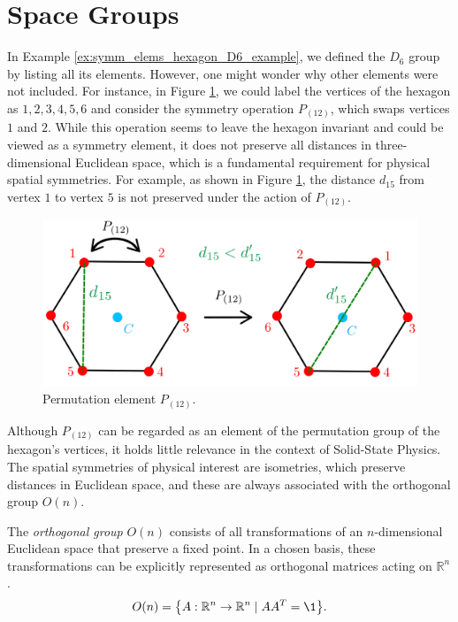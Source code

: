 \section{Space Groups} \label{sec:space_groups}

In Example \ref{ex:symm_elems_hexagon_D6_example}, we defined the \(D_6\) group by listing all its elements. However, one might wonder why other elements were not included. For instance, in Figure \ref{fig:hexagon_perm_12}, we could label the vertices of the hexagon as \(1, 2, 3, 4, 5, 6\) and consider the symmetry operation \(P_{(12)}\), which swaps vertices \(1\) and \(2\). While this operation seems to leave the hexagon invariant and could be viewed as a symmetry element, it does not preserve all distances in three-dimensional Euclidean space, which is a fundamental requirement for physical spatial symmetries. For example, as shown in Figure \ref{fig:hexagon_perm_12}, the distance \(d_{15}\) from vertex \(1\) to vertex \(5\) is not preserved under the action of \(P_{(12)}\).

\begin{figure}[H]
\centering
\includegraphics[width=0.8\linewidth]{fig/hexagon_perm_12.png}
\caption{Permutation element $P_{(12)}$.}
\label{fig:hexagon_perm_12}
\end{figure}

Although \(P_{(12)}\) can be regarded as an element of the permutation group of the hexagon’s vertices, it holds little relevance in the context of Solid-State Physics. The spatial symmetries of physical interest are isometries, which preserve distances in Euclidean space, and these are always associated with the orthogonal group \(O(n)\).

\begin{definition} \label{def:orthogonal_group}
The \textit{orthogonal group} \(O(n)\) consists of all transformations of an \(n\)-dimensional Euclidean space that preserve a fixed point. In a chosen basis, these transformations can be explicitly represented as orthogonal matrices acting on \(\mathbb{R}^n\).
\begin{equation} \label{eq:O(n)}
O(n) = \qty{A: \mathbb{R}^n \to \mathbb{R}^n \mid A A^T = \1}.
\end{equation}
\end{definition}


